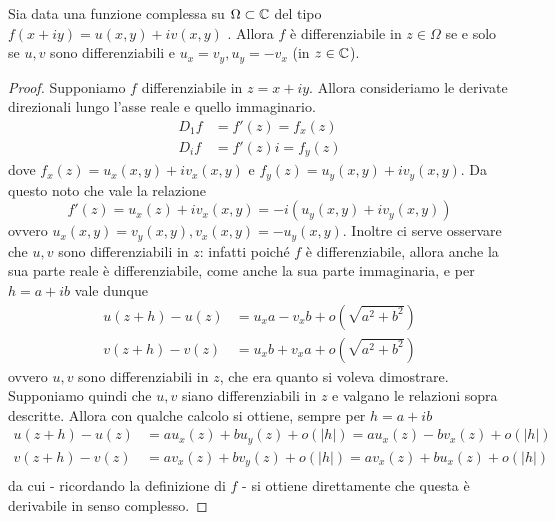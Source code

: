 \begin{theorem}
	Sia data una funzione complessa su $\Omega \subset \mathbb{C}$ del tipo $f(x+iy) = u(x,y) + iv(x,y)$ . Allora $f$ è differenziabile in $z \in \Omega$ se e solo se $u,v$ sono differenziabili e $u_x = v_y, u_y = - v_x$ (in $z \in \mathbb{C}$).
\end{theorem}
\begin{proof}
	Supponiamo $f$ differenziabile in $z=x+iy$. Allora consideriamo le derivate direzionali lungo l'asse reale e quello immaginario.
		\begin{equation*} \begin{aligned}
		D_{1} f  &= f'(z) = f_x(z) \\
		D_{i} f  &= f'(z)i = f_y(z)  
		\end{aligned}\end{equation*}
	dove $f_x(z) = u_x(x,y) + iv_x(x,y)$ e $f_y(z) = u_y(x,y) + iv_y(x,y)$. Da questo noto che vale la relazione
	\begin{equation*}
		f'(z) = u_x(z) + iv_x(x,y) = -i(u_y(x,y) + iv_y(x,y))
	\end{equation*}	
	ovvero $u_x(x,y) = v_y(x,y), v_x(x,y) = -u_y(x,y)$. Inoltre ci serve osservare che $u,v$ sono differenziabili in $z$: infatti poiché $f$ è differenziabile, allora anche la sua parte reale è differenziabile, come anche la sua parte immaginaria, e per $h = a + ib$ vale dunque 
	\begin{equation*}
	\begin{aligned}
		u(z+h) - u(z) & = u_x a - v_x b + o(\sqrt{a^2 + b^2})\\
		v(z+h) - v(z) & = u_x b + v_x a + o(\sqrt{a^2 + b^2})
	\end{aligned}
	\end{equation*}
	ovvero $u,v$ sono differenziabili in $z$, che era quanto si voleva dimostrare. 
	Supponiamo quindi che $u,v$ siano differenziabili in $z$ e valgano le relazioni sopra descritte. Allora con qualche calcolo si ottiene, sempre per $h = a + ib$
	\begin{equation*}
	\begin{aligned}
		u(z+h) - u(z) & = a u_x(z) + b u_y(z) + o(|h|) = a u_x(z) - b v_x(z) + o(|h|) \\
		v(z+h) - v(z) & = a v_x(z) + b v_y(z) + o(|h|) = a v_x(z) + b u_x(z) + o(|h|) \\
		\end{aligned}
	\end{equation*}
	da cui - ricordando la definizione di $f$ - si ottiene direttamente che questa è derivabile in senso complesso.
\end{proof}

